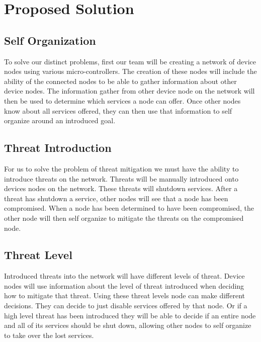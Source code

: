 \documentclass[onecolumn, draftclsnofoot,10pt, compsoc]{IEEEtran}
\begin{document}
\vspace{0.0 in}
\section*{Proposed Solution}
\subsection*{Self Organization}
To solve our distinct problems, first our team will be creating a network of device nodes using various micro-controllers. The creation of these nodes will include the ability of the connected nodes to be able to gather information about other device nodes. The information gather from other device node on the network will then be used to determine which services a node can offer. Once other nodes know about all services offered, they can then use that information to self organize around an introduced goal.
\subsection*{Threat Introduction}
For us to solve the problem of threat mitigation we must have the ability to introduce threats on the network. Threats will be manually introduced onto devices nodes on the network. These threats will shutdown services. After a threat has shutdown a service, other nodes will see that a node has been compromised. When a node has been determined to have been compromised, the other node will then self organize to mitigate the threats on the compromised node.
\subsection*{Threat Level}
Introduced threats into the network will have different levels of threat. Device nodes will use information about the level of threat introduced when deciding how to mitigate that threat. Using these threat levels node can make different decisions. They can decide to just disable services offered by that node. Or if a high level threat has been introduced they will be able to decide if an entire node and all of its services should be shut down, allowing other nodes to self organize to take over the lost services.


\end{document}
